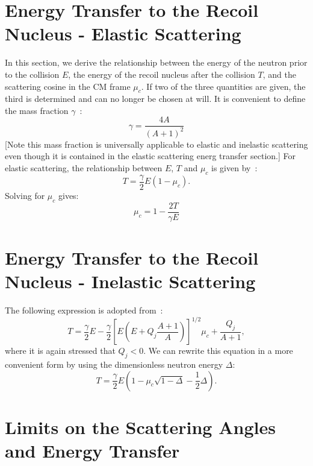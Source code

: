 \documentclass[review]{elsarticle}
\begin{document}
\section{Energy Transfer to the Recoil Nucleus - Elastic Scattering}
In this section, we derive the relationship between the energy of the neutron prior to the collision $E$, the energy of the recoil nucleus after the collision $T$, and the
scattering cosine in the CM frame $\mu_c$. If two of the three quantities are given, the third is determined and can no longer be chosen at will.
It is convenient to define the mass fraction $\gamma$~\cite{GaryWas}:
\begin{equation}
	\gamma = \frac{4 A}{(A+1)^2}
\end{equation}
[Note this mass fraction is universally applicable to elastic and inelastic scattering even though it is contained in the elastic scattering energ transfer section.]
For elastic scattering, the relationship between $E$, $T$ and $\mu_c$ is given by~\cite{GaryWas}:
\begin{equation}\label{eq:T_elastic}
	T = \frac{\gamma}{2} E (1-\mu_c).
\end{equation}
Solving for $\mu_c$ gives:
\begin{equation}
	\mu_c = 1 - \frac{2 T}{\gamma E}
	\label{eq:muc}
\end{equation}

\section{Energy Transfer to the Recoil Nucleus - Inelastic Scattering}
The following expression is adopted from~\cite{GaryWas}:
\begin{equation}\label{eq:T_inelastic_pre}
  T = \frac{\gamma}{2} E - \frac{\gamma}{2} \left[ E \left( E + Q_j \frac{A+1}{A} \right)  \right]^{1/2} \mu_c + \frac{Q_j}{A+1},
\end{equation}
where it is again stressed that $Q_j < 0$. We can rewrite this equation in a more convenient form by using the dimensionless neutron energy $\Delta$:
\begin{equation}\label{eq:T_inelastic}
  T = \frac{\gamma}{2} E \left (  1 - \mu_c \sqrt{1 - \Delta} - \frac{1}{2} \Delta \right ).
\end{equation}


\section{Limits on the Scattering Angles and Energy Transfer}
\end{document}
